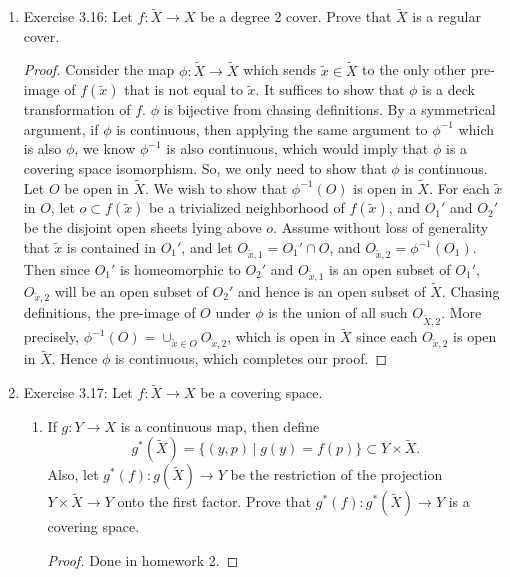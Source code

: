 \documentclass{article}
\begin{document}
\begin{enumerate}
  \item Exercise 3.16: Let $f:\tilde{X}\rightarrow X$ be a degree 2 cover.
    Prove that $\tilde{X}$ is a regular cover.
    \begin{proof}
      Consider the map $\phi:\tilde{X}\rightarrow\tilde{X}$ which sends
      $\tilde{x}\in\tilde{X}$ to the only other pre-image of $f(\tilde{x})$
      that is not equal to $\tilde{x}$. It suffices to show that $\phi$ is
      a deck transformation of $f$. $\phi$ is bijective from chasing
      definitions. By a symmetrical argument, if $\phi$ is continuous, then
      applying the same argument to $\phi^{-1}$ which is also $\phi$, we
      know $\phi^{-1}$ is also continuous, which would imply that $\phi$ is
      a covering space isomorphism. So, we only need to show that $\phi$ is
      continuous. \\

      Let $O$ be open in $\tilde{X}$. We wish to show that $\phi^{-1}(O)$
      is open in $\tilde{X}$. For each $\tilde{x}$ in $O$, let $o\subset
      f(\tilde{x})$ be a trivialized neighborhood of $f(\tilde{x})$, and
      $O_1'$ and $O_2'$ be the disjoint open sheets lying above $o$. Assume
      without loss of generality that $\tilde{x}$ is contained in $O_1'$,
      and let $O_{\tilde{x},1}=O_1'\cap O$, and
      $O_{\tilde{x},2}=\phi^{-1}(O_1)$. Then since $O_1'$ is homeomorphic
      to $O_2'$ and $O_{\tilde{x},1}$ is an open subset of $O_1'$,
      $O_{\tilde{x},2}$ will be an open subset of $O_2'$ and hence is an
      open subset of $\tilde{X}$. Chasing definitions, the pre-image of $O$
      under $\phi$ is the union of all such $O_{\tilde{X},2}$. More
      precisely, $\phi^{-1}(O)=\cup_{\tilde{x}\in O}O_{\tilde{x},2}$, which
      is open in $\tilde{X}$ since each $O_{\tilde{x},2}$ is open in
      $\tilde{X}$.  Hence $\phi$ is continuous, which completes our proof.
    \end{proof}

  \item Exercise 3.17: Let $f:\tilde{X}\rightarrow X$ be a covering space.
    \begin{enumerate}
      \item If $g:Y\rightarrow X$ is a continuous map, then define
        \begin{equation*}
          g^*(\tilde{X}) = \{(y,p)\,|\; g(y)=f(p)\}\subset
          Y\times\tilde{X}.
        \end{equation*}
        Also, let $g^*(f):g(\tilde{X})\rightarrow Y$ be the restriction of
        the projection $Y\times\tilde{X}\rightarrow Y$ onto the first
        factor. Prove that $g^*(f):g^*(\tilde{X})\rightarrow Y$ is a
        covering space. \label{qn:covering}
        \begin{proof}
          Done in homework 2.
        \end{proof}


\end{enumerate}
\end{enumerate}
\end{document}
